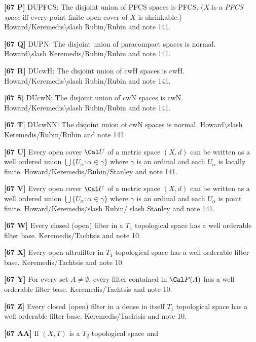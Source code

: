 \smallskip
\item{}{\bf [67 P]} DUPFCS: The disjoint union of PFCS spaces is PFCS.
($X$ is a {\it PFCS space} iff every point finite open cover of $X$ is
shrinkable.) \ac{Howard/Keremedis\slash Rubin/Rubin} \cite{1998b} and
note 141.
\smallskip
\item{}{\bf [67 Q]} DUPN: The disjoint union of paracompact spaces is
normal. \ac{Howard\slash Keremedis/Rubin/Rubin} \cite{1998b} and note 141.
\smallskip
\item{}{\bf [67 R]} DUcwH: The disjoint union of cwH spaces is cwH.
\ac{Howard/Keremedis\slash Rubin/Rubin} \cite{1998b} and note 141.
\smallskip
\item{}{\bf [67 S]} DUcwN: The disjoint union of cwN spaces is cwN.
\ac{Howard/Keremedis\slash Rubin/Rubin} \cite{1998b} and note 141.
\smallskip
\smallskip
\item{}{\bf [67 T]} DUcwNN: The disjoint union of cwN spaces is normal.
\ac{Howard\slash Keremedis/Rubin/Rubin} \cite{1998b} and note 141.
\smallskip
\item{}{\bf [67 U]} Every open cover $\Cal U$ of a metric space $(X,d)$ can
be written as a well ordered union $\bigcup \{U_\alpha : \alpha\in\gamma\}$
where $\gamma$ is an ordinal and each $U_\alpha$ is locally finite.
\ac{Howard/Keremedis/Rubin/Stanley} \cite{1999} and note 141.
\smallskip
\item{}{\bf [67 V]} Every open cover $\Cal U$ of a metric space $(X,d)$ can
be written as a well ordered union $\bigcup \{U_\alpha : \alpha\in\gamma\}$
where $\gamma$ is an ordinal and each $U_\alpha$ is point finite.
\ac{Howard/Keremedis/slash Rubin/ slash Stanley} \cite{1999} and note 141.
\smallskip
\item{}{\bf [67 W]} Every closed (open) filter in a $T_1$ topological
space has a well orderable filter base.  \ac{Keremedis/Tachtsis}
\cite{1999b} and note 10.
\smallskip
\item{}{\bf [67 X]} Every open ultrafilter in $T_1$ topological space
has a well orderable filter base.  \ac{Keremedis/Tachtsis} \cite{1999b}
and note 10.
\smallskip
\item{}{\bf [67 Y]} For every set $A\ne\emptyset$, every filter
contained in $\Cal P(A)$ has a well orderable filter base.
\ac{Keremedis/Tachtsis} \cite{2000} and note 10.
\smallskip
\item{}{\bf [67 Z]} Every closed (open) filter in a dense in itself
$T_1$ topological space has a well orderable filter base.
\ac{Keremedis/Tachtsis} \cite{2000} and note 10.
\smallskip
\item{}{\bf [67 AA]}  If $(X,T)$ is a $T_2$ topological space and
